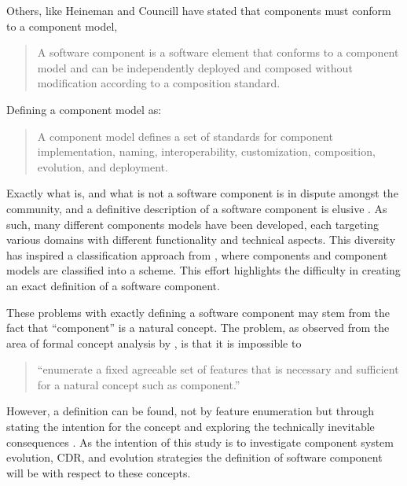 Others, like Heineman and Councill \cite{heineman2001component} have stated that components must conform to a component model, 
\begin{quotation}
A software component is a software element that conforms to a component model and can be independently deployed and composed without modification according to a composition standard.
\end{quotation}

Defining a component model as:
\begin{quotation}
A component model defines a set of standards for component implementation, naming, interoperability, customization, composition, evolution, and deployment.
\end{quotation}

Exactly what is, and what is not a software component is in dispute amongst the community,
and a definitive description of a software component is elusive \cite{vasa2007patterns}.
As such, many different components models have been developed, each targeting various domains with different functionality and technical aspects.
This diversity has inspired a classification approach from \cite{Crnkovic2011}, where components and component models are classified into a scheme.
This effort highlights the difficulty in creating an exact definition of a software component. 

These problems with exactly defining a software component may stem from the fact that ``component'' is a natural concept.
The problem, as observed from the area of formal concept analysis \cite{Ganter1999} by \cite{Szyperski2002}, is that it is impossible to

\begin{quotation} 
``enumerate a fixed agreeable set of features that is necessary and sufficient for a natural concept such as component.'' 
\end{quotation}

However, a definition can be found, not by feature enumeration but through stating the intention for the concept and exploring the technically inevitable consequences \cite{Szyperski2002}. 
As the intention of this study is to investigate component system evolution, CDR, and evolution strategies
the definition of software component will be with respect to these concepts.

